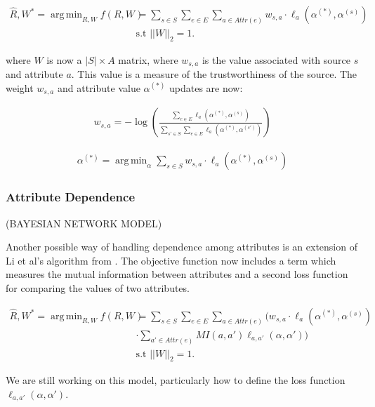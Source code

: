 \documentclass{acm_proc_article-sp}
\DeclareMathOperator*{\argmin}{arg\,min}
\begin{document}
\begin{align}
\hat{R}, W^* = \argmin_{R,W} f(R, W) & = \sum_{s \in S} \sum_{e \in E} \sum_{a \in Attr(e)} w_{s,a} \cdot \ell_a(\alpha^{(*)}, \alpha^{(s)}) \\
& \text{s.t } ||W||_2 =1. \nonumber 
\end{align}

where  $W$ is now a $|S|\times A$ matrix, where $w_{s,a}$ is the value associated with source $s$ and attribute $a$. This value is a measure of the trustworthiness of the source. The weight $w_{s,a}$ and attribute value $\alpha^{(*)}$ updates are now: 


\begin{align}
w_{s,a} = - \log \left ( \frac{\sum_{e \in E} \ell_a(\alpha^{(*)}, \alpha^{(s)})}{\sum_{s' \in S} \sum_{e \in E}  \ell_a(\alpha^{(*)}, \alpha^{(s')})} \right )
\end{align}

\begin{align}
\alpha^{(*)} = \argmin_\alpha \sum_{s \in S} w_{s,a} \cdot \ell_a(\alpha^{(*)}, \alpha^{(s)})
\end{align}


\subsubsection{Attribute Dependence}

(BAYESIAN NETWORK MODEL)

\vspace{1cm}


Another possible way of handling dependence among attributes is an extension of Li et al's algorithm from \cite{li:resolving}. The objective function now includes a term which measures the mutual information between attributes and a second loss function for comparing the values of two attributes.  

\begin{align}
\hat{R}, W^* = \argmin_{R,W} f(R, W) & = \sum_{s \in S} \sum_{e \in E} \sum_{a \in Attr(e)} \Bigg ( w_{s,a} \cdot \ell_a(\alpha^{(*)}, \alpha^{(s)}) \nonumber \\
&  \cdot \sum_{a' \in Attr(e)} MI(a,a') \ell_{a,a'}(\alpha,\alpha')  \Bigg ) \\
& \text{s.t } ||W||_2 =1. \nonumber 
\end{align}

We are still working on this model, particularly how to define the loss function $\ell_{a,a'}(\alpha,\alpha')$. 
\end{document}
